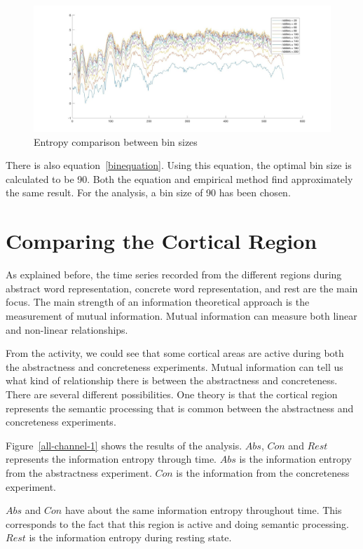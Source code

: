 \begin{figure}[!htb]
\caption{Entropy comparison between bin sizes}
\label{bins}
    \centering
    \includegraphics[width=1.2\textwidth]{fig/bins}
\end{figure}

There is also equation~\ref{binequation}. Using this equation, the optimal bin size is calculated to be 90. Both the equation and empirical method find approximately the same result. For the analysis, a bin size of 90 has been chosen. 

\section{Comparing the Cortical Region}\label{analysis1}

As explained before, the time series recorded from the different regions during abstract word representation, concrete word representation, and rest are the main focus. The main strength of an information theoretical approach is the measurement of mutual information. Mutual information can measure both linear and non-linear relationships. 

From the activity, we could see that some cortical areas are active during both the abstractness and concreteness experiments. Mutual information can tell us what kind of relationship there is between the abstractness and concreteness. There are several different possibilities. One theory is that the cortical region represents the semantic processing that is common between the abstractness and concreteness experiments.

Figure~\ref{all-channel-1} shows the results of the analysis. $Abs$, $Con$ and $Rest$ represents the information entropy through time. $Abs$ is the information entropy from the abstractness experiment. $Con$ is the information from the concreteness experiment. 

$Abs$ and $Con$ have about the same information entropy throughout time. This corresponds to the fact that this region is active and doing semantic processing. $Rest$ is the information entropy during resting state. 

